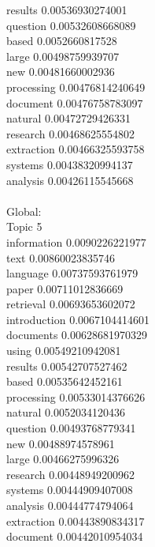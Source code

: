 \documentclass{article}
\begin{document}
results 0.00536930274001\\
question 0.00532608668089\\
based 0.0052660817528\\
large 0.00498759939707\\
new 0.00481660002936\\
processing 0.00476814240649\\
document 0.00476758783097\\
natural 0.00472729426331\\
research 0.00468625554802\\
extraction 0.00466325593758\\
systems 0.00438320994137\\
analysis 0.00426115545668\\
\\
Global:\\
Topic 5\\
information 0.0090226221977\\
text 0.00860023835746\\
language 0.00737593761979\\
paper 0.00711012836669\\
retrieval 0.00693653602072\\
introduction 0.0067104414601\\
documents 0.00628681970329\\
using 0.00549210942081\\
results 0.00542707527462\\
based 0.00535642452161\\
processing 0.00533014376626\\
natural 0.0052034120436\\
question 0.00493768779341\\
new 0.00488974578961\\
large 0.00466275996326\\
research 0.00448949200962\\
systems 0.00444909407008\\
analysis 0.00444774794064\\
extraction 0.00443890834317\\
document 0.00442010954034\\
\end{document}
